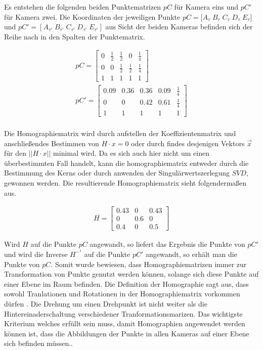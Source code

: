  Es entstehen die folgenden beiden Punktematrizen $pC$ für Kamera eins und $pC'$ für Kamera zwei. Die Koordinaten der jeweiligen Punkte $ pC = [A_\tau \;B_\tau\;C_\tau\;D_\tau\;E_\tau$] und $pC' =[A_{\tau'}\;B_{\tau'}\;C_{\tau'}\;D_{\tau'}\;E_{\tau'}]$ aus Sicht der beiden Kameras befinden sich der Reihe nach in den Spalten der Punktematrix.
 
 \begin{gather}
 	pC = 
 	\begin{bmatrix}
 	0&\frac{1}{2}&\frac{1}{2}&0&\frac{1}{4}\\
 	0&0&\frac{1}{2}&\frac{1}{2}&\frac{1}{4}\\
 	1&1&1&1&1
 	\end{bmatrix}\\
 	pC'=
 		\begin{bmatrix}
 	0.09&0.36&0.36&0.09&\frac{1}{4}\\
 	0&0&0.42&0.61&\frac{1}{4}\\
 	1&1&1&1&1
 	\end{bmatrix}\\
 \end{gather}

Die Homographiematrix wird durch aufstellen der Koeffizientenmatrix und anschließendes Bestimmen von $H \cdot x = 0$ oder durch findes desjenigen Vektors $\vec{x}$ für den $||H\cdot x||$ minimal wird. Da es sich auch hier nicht um einen überbestimmten Fall handelt, kann die homographiematrix entweder durch die Bestimmung des Kerns oder durch anwenden der Singulärwertszerlegung $SVD$, gewonnen werden. Die resultierende Homographiematrix sieht folgendermaßen aus.

\begin{gather}
	H = \begin{bmatrix}
	0.43&0&0.43\\
	0&0.6&0\\
	0.4&0&0.5
	\end{bmatrix}
\end{gather}

Wird $H$ auf die Punkte $pC$ angewandt, so liefert das Ergebnis die Punkte von $pC'$ und wird die Inverse $H^{-^1}$ auf die Punkte $pC'$ angewandt, so erhält man die Punkte von $pC$. Somit wurde bewiesen, dass Homographiematrizen immer zur Transformation von Punkte genutzt werden können, solange sich diese Punkte auf einer Ebene im Raum befinden. Die Definition der Homographie sagt aus, dass sowohl Tranlationen und Rotationen in der Homographiematrix vorkommen dürfen \cite{Roser} \cite{Peiffer}. Die Drehung um einen Drehpunkt ist nicht weiter als die Hintereinaderschaltung verschiedener Tranformationsmarizen. Das wichtigste Kriterium welches erfüllt sein muss, damit Homographien angewendet werden können ist, dass die Abbildungen der Punkte in allen Kameras auf einer Ebene sich befinden müssen.\cite{Elements}.

